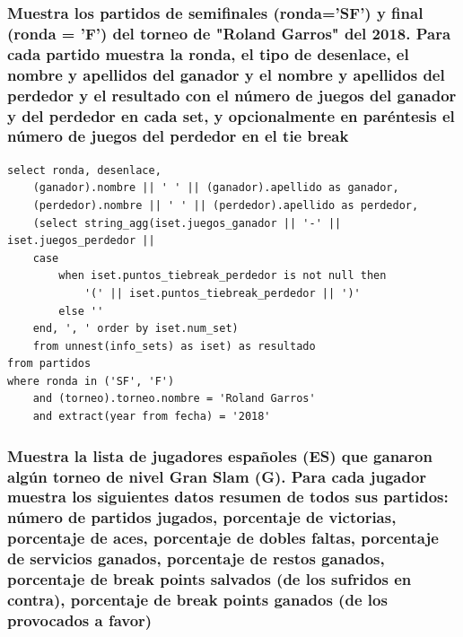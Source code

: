 \documentclass[11pt]{opticajnl}
\begin{document}
\subsubsection{Muestra los partidos de semiﬁnales (ronda='SF') y ﬁnal (ronda = 'F') del torneo de "Roland Garros" del 2018. Para cada partido muestra la ronda, el tipo de desenlace, el nombre y apellidos del ganador y el nombre y apellidos del perdedor y el resultado con el número de juegos del ganador y del perdedor en cada set, y opcionalmente en paréntesis el número de juegos del perdedor en el tie break}

\begin{verbatim}
select ronda, desenlace, 
	(ganador).nombre || ' ' || (ganador).apellido as ganador,
	(perdedor).nombre || ' ' || (perdedor).apellido as perdedor, 
	(select string_agg(iset.juegos_ganador || '-' || iset.juegos_perdedor ||
	case
		when iset.puntos_tiebreak_perdedor is not null then 
			'(' || iset.puntos_tiebreak_perdedor || ')'
		else ''
	end, ', ' order by iset.num_set) 
	from unnest(info_sets) as iset) as resultado
from partidos
where ronda in ('SF', 'F')
	and (torneo).torneo.nombre = 'Roland Garros'
	and extract(year from fecha) = '2018'
\end{verbatim}





\subsubsection{Muestra la lista de jugadores españoles (ES) que ganaron algún torneo de nivel Gran Slam (G). Para cada jugador muestra los siguientes datos resumen de todos sus partidos: número de partidos jugados, porcentaje de victorias, porcentaje de aces, porcentaje de dobles faltas, porcentaje de servicios ganados, porcentaje de restos ganados, porcentaje de break points salvados (de los sufridos en contra), porcentaje de break points ganados (de los provocados a favor)}
\end{document}
